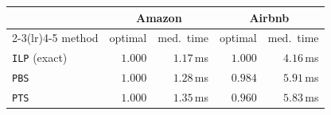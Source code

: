 \begin{tabular}{lrrrr}
\toprule
& \multicolumn{2}{c}{Amazon} & \multicolumn{2}{c}{Airbnb} \\
\cmidrule(lr){2-3}\cmidrule(lr){4-5}
method & optimal & med.\ time & optimal & med.\ time \\
\midrule
\texttt{ILP} (exact) & $1.000$ & $1.17$\,ms & $1.000$ & $4.16$\,ms \\
\texttt{PBS} & $1.000$ & $1.28$\,ms & $0.984$ & $5.91$\,ms \\
\texttt{PTS} & $1.000$ & $1.35$\,ms & $0.960$ & $5.83$\,ms \\
\bottomrule
\end{tabular}
